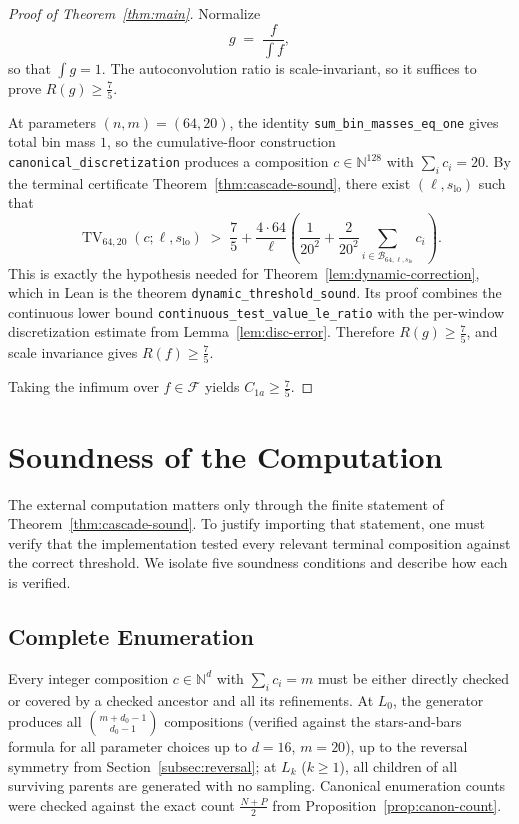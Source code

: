 \documentclass[11pt, letterpaper]{article}
\theoremstyle{paperplain}
\theoremstyle{paperdef}
\newcommand{\N}{\mathbb{N}}
\begin{document}
\begin{proof}[Proof of Theorem~\ref{thm:main}]
Normalize
\[
  g \;=\; \frac{f}{\int f},
\]
so that $\int g = 1$.  The autoconvolution ratio is scale-invariant,
so it suffices to prove $R(g)\ge \tfrac75$.

At parameters $(n,m)=(64,20)$, the identity
\texttt{sum\_bin\_masses\_eq\_one} gives total bin mass $1$, so the
cumulative-floor construction
\texttt{canonical\_discretization} produces a composition
$c\in\N^{128}$ with $\sum_i c_i=20$.  By the terminal certificate
Theorem~\ref{thm:cascade-sound}, there exist
$(\ell,s_{\mathrm{lo}})$ such that
\[
  \operatorname{TV}_{64,20}(c;\ell,s_{\mathrm{lo}})
  \;>\;
  \frac75
  +
  \frac{4\cdot 64}{\ell}
  \left(
    \frac{1}{20^2}
    +
    \frac{2}{20^2}
    \sum_{i\in\mathcal{B}_{64,\ell,s_{\mathrm{lo}}}} c_i
  \right).
\]
This is exactly the hypothesis needed for
Theorem~\ref{lem:dynamic-correction}, which in Lean is the theorem
\texttt{dynamic\_threshold\_sound}.  Its proof combines the
continuous lower bound \texttt{continuous\_test\_value\_le\_ratio} with
the per-window discretization estimate from
Lemma~\ref{lem:disc-error}.  Therefore $R(g)\ge \tfrac75$, and scale
invariance gives $R(f)\ge \tfrac75$.

Taking the infimum over $f\in\mathcal{F}$ yields
$C_{1a}\ge \tfrac75$.
\end{proof}


\section{Soundness of the Computation}\label{sec:correctness}

The external computation matters only through the finite statement of
Theorem~\ref{thm:cascade-sound}.  To justify importing that statement,
one must verify that the implementation tested every relevant terminal
composition against the correct threshold.  We isolate five soundness
conditions and describe how each is verified.

\subsection{Complete Enumeration}

Every integer composition
$c \in \N^d$ with $\sum_i c_i = m$ must be either directly checked or
covered by a checked ancestor and all its refinements.
At $L_0$, the generator produces all $\binom{m + d_0 - 1}{d_0 - 1}$
compositions (verified against the stars-and-bars formula for all
parameter choices up to $d=16$, $m=20$), up to the reversal symmetry
from Section~\ref{subsec:reversal}; at $L_k$ ($k \ge 1$), all children
of all surviving parents are generated with no sampling.  Canonical
enumeration counts were checked against the exact count
$\tfrac{N+P}{2}$ from Proposition~\ref{prop:canon-count}.
\end{document}
